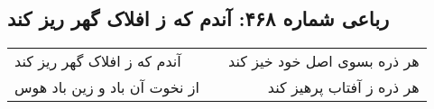 \begin{center}
\section*{رباعی شماره ۴۶۸: آندم که ز افلاک گهر ریز کند}
\label{sec:0468}
\begin{longtable}{l p{0.5cm} r}
آندم که ز افلاک گهر ریز کند
&&
هر ذره بسوی اصل خود خیز کند
\\
از نخوت آن باد و زین باد هوس
&&
هر ذره ز آفتاب پرهیز کند
\\
\end{longtable}
\end{center}
